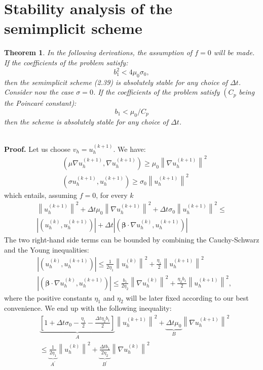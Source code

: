 \documentclass[11pt]{book}
\newtheorem{theorem}{Theorem}
\begin{document}
\section{Stability analysis of the semimplicit scheme}
\begin{theorem}
In the following derivations, the assumption of $f=0$ will be made.
If the coefficients of the problem satisfy:
$$
b_{1}^{2}<4 \mu_{0} \sigma_{0},
$$
then the semimplicit scheme (2.39) is absolutely stable for any choice of $\Delta t$. Consider now the case $\sigma=0$. If the coefficients of the problem satisfy $\left(C_{p}\right.$ being the Poincaré constant):
$$
b_{1}<\mu_{0} / C_{p}
$$
then the scheme is absolutely stable for any choice of $\Delta t$.  \\ \\
\end{theorem}
\textbf{Proof.} 
Let us choose $v_{h}=u_{h}^{(k+1)}$. We have:
$$
\begin{aligned}
& \left(\mu \nabla u_{h}^{(k+1)}, \nabla u_{h}^{(k+1)}\right) \geq \mu_{0}\left\|\nabla u_{h}^{(k+1)}\right\|^{2} \\
& \left(\sigma u_{h}^{(k+1)}, u_{h}^{(k+1)}\right) \geq \sigma_{0}\left\|u_{h}^{(k+1)}\right\|^{2}
\end{aligned}
$$
which entails, assuming $f = 0$, for every $k$
$$
\begin{array}{r}
\left\|u_{h}^{(k+1)}\right\|^{2}+\Delta t \mu_{0}\left\|\nabla u_{h}^{(k+1)}\right\|^{2}+\Delta t \sigma_{0}\left\|u_{h}^{(k+1)}\right\|^{2} \leq \\
\left|\left(u_{h}^{(k)}, u_{h}^{(k+1)}\right)\right|+\Delta t\left|\left(\boldsymbol{\beta} \cdot \nabla u_{h}^{(k)}, u_{h}^{(k+1)}\right)\right|
\end{array}
$$
The two right-hand side terms can be bounded by combining the Cauchy-Schwarz and the Young inequalities:
$$
\begin{aligned}
& \left|\left(u_{h}^{(k)}, u_{h}^{(k+1)}\right)\right| \leq \frac{1}{2 \eta_{1}}\left\|u_{h}^{(k)}\right\|^{2}+\frac{\eta_{1}}{2}\left\|u_{h}^{(k+1)}\right\|^{2} \\
& \left|\left(\boldsymbol{\beta} \cdot \nabla u_{h}^{(k)}, u_{h}^{(k+1)}\right)\right| \leq \frac{b_{1}}{2 \eta_{2}}\left\|\nabla u_{h}^{(k)}\right\|^{2}+\frac{\eta_{2} b_{1}}{2}\left\|u_{h}^{(k+1)}\right\|^{2},
\end{aligned}
$$
where the positive constants $\eta_{1}$ and $\eta_{2}$ will be later fixed according to our best convenience.
We end up with the following inequality:
$$
\begin{aligned}
& \underbrace{\left[1+\Delta t \sigma_{0}-\frac{\eta_{1}}{2}-\frac{\Delta t \eta_{2} b_{1}}{2}\right]}_{A}\left\|u_{h}^{(k+1)}\right\|^{2}+\underbrace{\Delta t \mu_{0}}_{B}\left\|\nabla u_{h}^{(k+1)}\right\|^{2} \\
& \leq \underbrace{\frac{1}{2 \eta_{1}}}_{A^{\prime}}\left\|u_{h}^{(k)}\right\|^{2}+\underbrace{\frac{\Delta t b_{1}}{2 \eta_{2}}}_{B^{\prime}}\left\|\nabla u_{h}^{(k)}\right\|^{2}
\end{aligned}
$$
\end{document}
